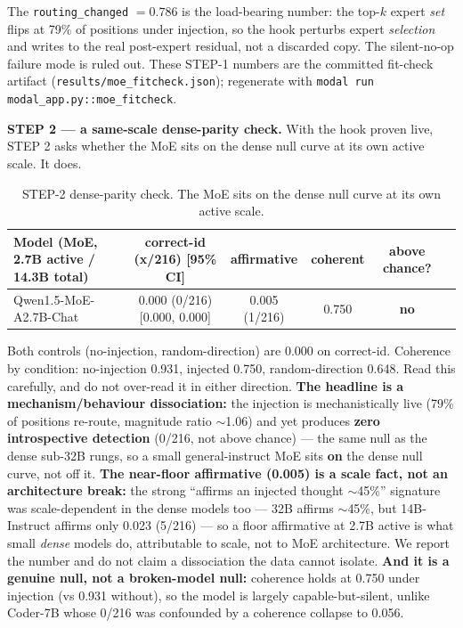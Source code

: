 \documentclass[11pt]{article}
\begin{document}
The \texttt{routing\_changed} $= 0.786$ is the load-bearing number: the top-$k$ expert \emph{set} flips at 79\% of positions under injection, so the hook perturbs expert \emph{selection} and writes to the real post-expert residual, not a discarded copy. The silent-no-op failure mode is ruled out. These STEP-1 numbers are the committed fit-check artifact (\texttt{results/moe\_fitcheck.json}); regenerate with \texttt{modal run modal\_app.py::moe\_fitcheck}.

\textbf{STEP 2 --- a same-scale dense-parity check.} With the hook proven live, STEP 2 asks whether the MoE sits on the dense null curve at its own active scale. It does.

\begin{table}[htbp]
\centering
\small
\begin{tabular}{lccccc}
\toprule
Model (MoE, 2.7B active / 14.3B total) & correct-id (x/216) [95\% CI] & affirmative & coherent & above chance? \\
\midrule
Qwen1.5-MoE-A2.7B-Chat & 0.000 (0/216) [0.000, 0.000] & 0.005 (1/216) & 0.750 & \textbf{no} \\
\bottomrule
\end{tabular}
\caption{STEP-2 dense-parity check. The MoE sits on the dense null curve at its own active scale.}
\label{tab:moe-step2}
\end{table}

Both controls (no-injection, random-direction) are 0.000 on correct-id. Coherence by condition: no-injection 0.931, injected 0.750, random-direction 0.648. Read this carefully, and do not over-read it in either direction. \textbf{The headline is a mechanism/behaviour dissociation:} the injection is mechanistically live (79\% of positions re-route, magnitude ratio $\sim$1.06) and yet produces \textbf{zero introspective detection} (0/216, not above chance) --- the same null as the dense sub-32B rungs, so a small general-instruct MoE sits \textbf{on} the dense null curve, not off it. \textbf{The near-floor affirmative (0.005) is a scale fact, not an architecture break:} the strong ``affirms an injected thought $\sim$45\%'' signature was scale-dependent in the dense models too --- 32B affirms $\sim$45\%, but 14B-Instruct affirms only 0.023 (5/216) --- so a floor affirmative at 2.7B active is what small \emph{dense} models do, attributable to scale, not to MoE architecture. We report the number and do not claim a dissociation the data cannot isolate. \textbf{And it is a genuine null, not a broken-model null:} coherence holds at 0.750 under injection (vs 0.931 without), so the model is largely capable-but-silent, unlike Coder-7B whose 0/216 was confounded by a coherence collapse to 0.056.
\end{document}
